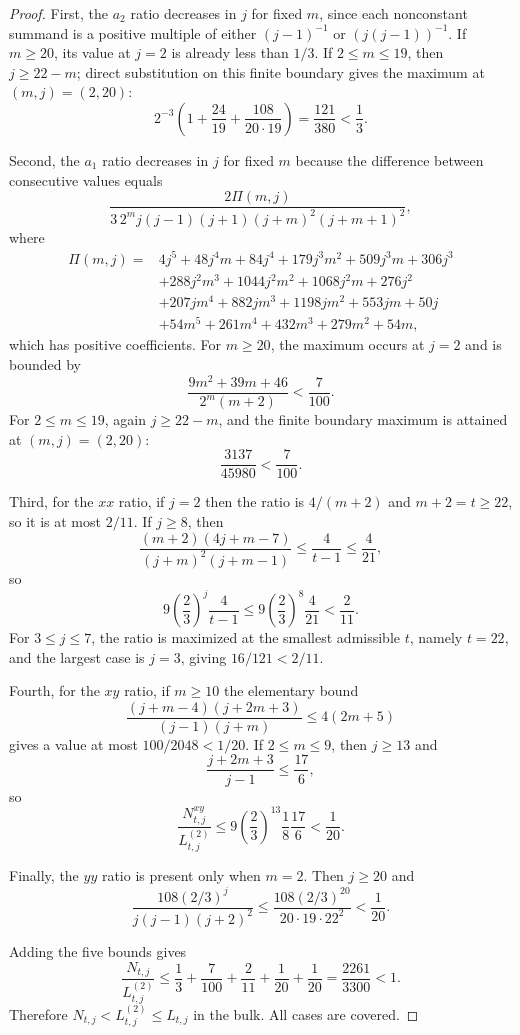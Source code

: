 \documentclass[11pt]{article}
\theoremstyle{definition}
\begin{document}
\begin{proof}
First, the $a_2$ ratio decreases in $j$ for fixed $m$, since each
nonconstant summand is a positive multiple of either $(j-1)^{-1}$ or
$(j(j-1))^{-1}$.  If $m\ge20$, its value at $j=2$ is already less than
$1/3$.  If $2\le m\le19$, then $j\ge22-m$; direct substitution on this
finite boundary gives the maximum at $(m,j)=(2,20)$:
\[
  2^{-3}\left(1+\frac{24}{19}+\frac{108}{20\cdot19}\right)
  =\frac{121}{380}<\frac13.
\]

Second, the $a_1$ ratio decreases in $j$ for fixed $m$ because the
difference between consecutive values equals
\[
\frac{2\Pi(m,j)}{3\,2^m j(j-1)(j+1)(j+m)^2(j+m+1)^2},
\]
where
\begin{align*}
\Pi(m,j)={}&4j^5+48j^4m+84j^4+179j^3m^2+509j^3m+306j^3\\
&+288j^2m^3+1044j^2m^2+1068j^2m+276j^2\\
&+207jm^4+882jm^3+1198jm^2+553jm+50j\\
&+54m^5+261m^4+432m^3+279m^2+54m,
\end{align*}
which has positive coefficients.  For $m\ge20$, the maximum occurs at
$j=2$ and is bounded by
\[
  \frac{9m^2+39m+46}{2^m(m+2)}<\frac7{100}.
\]
For $2\le m\le19$, again $j\ge22-m$, and the finite boundary maximum is
attained at $(m,j)=(2,20)$:
\[
  \frac{3137}{45980}<\frac7{100}.
\]

Third, for the $xx$ ratio, if $j=2$ then the ratio is $4/(m+2)$ and
$m+2=t\ge22$, so it is at most $2/11$.  If $j\ge8$, then
\[
  \frac{(m+2)(4j+m-7)}{(j+m)^2(j+m-1)}\le \frac4{t-1}\le\frac4{21},
\]
so
\[
  9\left(\frac23\right)^j\frac4{t-1}
  \le 9\left(\frac23\right)^8\frac4{21}<\frac2{11}.
\]
For $3\le j\le7$, the ratio is maximized at the smallest admissible
$t$, namely $t=22$, and the largest case is $j=3$, giving $16/121<2/11$.

Fourth, for the $xy$ ratio, if $m\ge10$ the elementary bound
\[
  \frac{(j+m-4)(j+2m+3)}{(j-1)(j+m)}
  \le 4(2m+5)
\]
gives a value at most $100/2048<1/20$.  If $2\le m\le9$, then
$j\ge13$ and
\[
  \frac{j+2m+3}{j-1}\le\frac{17}{6},
\]
so
\[
  \frac{N^{xy}_{t,j}}{L^{(2)}_{t,j}}
  \le 9\left(\frac23\right)^{13}\frac18\frac{17}{6}<\frac1{20}.
\]

Finally, the $yy$ ratio is present only when $m=2$.  Then $j\ge20$ and
\[
  \frac{108(2/3)^j}{j(j-1)(j+2)^2}
  \le \frac{108(2/3)^{20}}{20\cdot19\cdot22^2}<\frac1{20}.
\]

Adding the five bounds gives
\[
  \frac{N_{t,j}}{L^{(2)}_{t,j}}
  \le \frac13+\frac7{100}+\frac2{11}+\frac1{20}+\frac1{20}
  =\frac{2261}{3300}<1.
\]
Therefore $N_{t,j}<L^{(2)}_{t,j}\le L_{t,j}$ in the bulk.  All cases are covered.
\end{proof}
\end{document}
